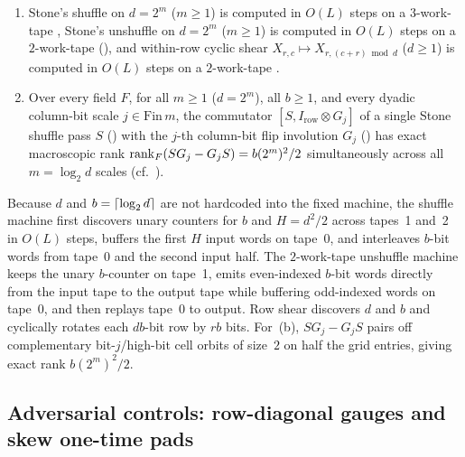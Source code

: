 \begin{proposition}\label{prop:stone-tm}
\begin{enumerate}[label=(\alph*)]
\item Stone's shuffle on $d = 2^m$ ($m \ge 1$) is computed in $O(L)$ steps on a $3$-work-tape
  , Stone's unshuffle on $d = 2^m$ ($m \ge 1$) is computed in $O(L)$ steps on
  a $2$-work-tape  (), and within-row
  cyclic shear $X_{r,c} \mapsto X_{r, (c+r)\bmod d}$ ($d \ge 1$) is computed in $O(L)$ steps on a
  $2$-work-tape .
\item Over every field $F$, for all $m \ge 1$ ($d = 2^m$), all $b \ge 1$, and every dyadic
  column-bit scale $j \in \mathrm{Fin}\,m$, the commutator $[S, I_{\mathrm{row}} \otimes G_j]$ of a
  single Stone shuffle pass $S$ () with the $j$-th column-bit flip
  involution $G_j$ () has exact macroscopic rank
  $\operatorname{rank}_F(S G_j - G_j S) = b(2^m)^2 / 2$ simultaneously across all $m = \log_2 d$ scales
  (cf.\ \cite[Section~4.3, Corollary~6.13, and Remark~6.14]{SeventeenthPaper2026}).
\end{enumerate}
\end{proposition}
\begin{outline}
Because $d$ and $b = \lceil \log_2 d \rceil$ are not hardcoded into the fixed machine, the shuffle machine first
discovers unary counters for $b$ and $H = d^2/2$ across tapes~1 and~2 in $O(L)$ steps, buffers the
first $H$ input words on tape~0, and interleaves $b$-bit words from tape~0 and the second input half.
The $2$-work-tape unshuffle machine keeps the unary $b$-counter on tape~1, emits even-indexed $b$-bit
words directly from the input tape to the output tape while buffering odd-indexed words on tape~0,
and then replays tape~0 to output. Row shear discovers $d$ and $b$ and cyclically rotates each
$db$-bit row by $rb$ bits. For~(b), $S G_j - G_j S$ pairs off complementary bit-$j$/high-bit cell
orbits of size~$2$ on half the grid entries, giving exact rank $b(2^m)^2 / 2$.
\end{outline}

\subsection{Adversarial controls: row-diagonal gauges and skew one-time pads}\label{sec:osr-controls}

